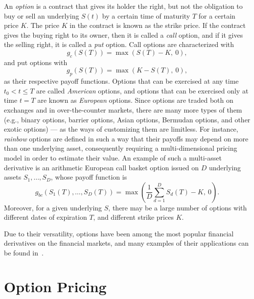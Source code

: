 \documentclass{UUThesisTemplate}
\begin{document}
\par
An \emph{option} is a contract that gives its holder the right, but not the obligation to buy or sell an underlying $S(t)$ by a certain time of maturity $T$ for a certain price $K$. The price $K$ in the contract is known as the strike price. If the contract gives the buying right to its owner, then it is called a \emph{call} option, and if it gives the selling right, it is called a \emph{put} option. Call options are characterized with 
\begin{equation}
\label{eq:callop}
g_c(S(T))=\max(S(T)-K,\ 0),
\end{equation}
and put options with 
\begin{equation}
\label{eq:putop}
g_p(S(T))=\max(K-S(T),\ 0),
\end{equation}
as their respective payoff functions. Options that can be exercised at any time $t_0 < t \leq T$ are called \emph{American} options, and options that can be exercised only at time $t=T$ are known as \emph{European} options. Since options are traded both on exchanges and in over-the-counter markets, there are many more types of them (e.g., binary options, barrier options, Asian options, Bermudan options, and other exotic options) --- as the ways of customizing them are limitless. For instance, \emph{rainbow} options are defined in such a way that their payoffs may depend on more than one underlying asset, consequently requiring a multi-dimensional pricing model in order to estimate their value. An example of such a multi-asset derivative is an arithmetic European call basket option issued on $D$ underlying assets $S_1,\ldots,S_D$, whose payoff function is 
\begin{equation}
\label{eq:basketop}
g_{bc}(S_1(T),\ldots,S_D(T)) = \max\left(\frac{1}{D}\sum_{d=1}^D S_d(T) - K,\ 0\right).
\end{equation}
Moreover, for a given underlying $S$, there may be a large number of options with different dates of expiration $T$, and different strike prices $K$.

\par
Due to their versatility, options have been among the most popular financial derivatives on the financial markets, and many examples of their applications can be found in~\cite{hull2017options}.
%
%





%
\chapter{Option Pricing}
\label{ch:optionpricing}
\end{document}
